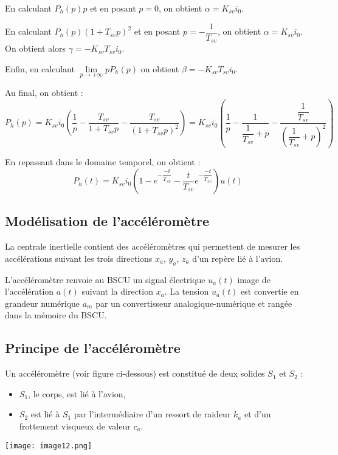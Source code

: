 \begin{multicols}{2}
\begin{corrige}
En calculant $P_h(p)p$ et en posant $p=0$, on obtient $\alpha = K_{sv}i_0$.

En calculant $P_h(p)\left(1+T_{sv} p\right)^2$ et en posant
$p=-\dfrac{1}{T_{sv}}$, on obtient $\alpha = K_{sv}i_0$. On obtient alors
$\gamma = - K_{sv} T_{sv} i_0$.

Enfin, en calculant $\lim\limits_{p\to +\infty} p P_h(p)$ on obtient $\beta =
-K_{sv} T_{sv} i_0$.

Au final, on obtient : 
$$
P_h(p) = K_{sv} i_0 \left( \dfrac{1}{p} - \dfrac{T_{sv}}{1+T_{sv}p} -
\dfrac{T_{sv}}{\left(1+T_{sv}p\right)^2} \right) 
=
K_{sv} i_0
\left( 
\dfrac{1}{p}
-\dfrac{1}{\dfrac{1}{T_{sv}}+p}
-\dfrac{\dfrac{1}{T_{sv}}}{\left(\dfrac{1}{T_{sv}}+p\right)^2}
\right) 
$$


En repassant dans le domaine temporel, on obtient :
$$
P_h(t) = K_{sv} i_0 \left( 
1-e^{-\dfrac{-t}{T_{sv}}}
-\dfrac{t}{T_{sv}}e^{-\dfrac{-t}{T_{sv}}}
\right) u(t)
$$
\end{corrige}
\else
\fi


\subsection*{Modélisation de l'accéléromètre}
\ifprof
\else
La centrale inertielle contient des accéléromètres qui permettent de mesurer les accélérations suivant les
trois directions $x_a$, $y_a$, $z_a$ d’un repère lié à l’avion.

L’accéléromètre renvoie au BSCU un signal électrique $u_a(t)$ image de l’accélération $a(t)$ suivant la
direction $x_a$. La tension $u_a(t)$ est convertie en grandeur numérique $a_m$ par un convertisseur analogique-numérique et rangée dans la mémoire du BSCU. 
\fi

\subsection*{Principe de l’accéléromètre}
\ifprof
\else

Un accéléromètre (voir figure ci-dessous) est constitué de deux solides
$S_1$ et $S_2$ :
\begin{itemize}
\item $S_1$, le corps, est lié à l’avion,
\item $S_2$ est lié à $S_1$ par l’intermédiaire d’un ressort de raideur $k_a$ et d’un frottement visqueux de valeur $c_a$.
\end{itemize}

\begin{center}
\texttt{[image: image12.png]}


\end{center}
\end{multicols}
